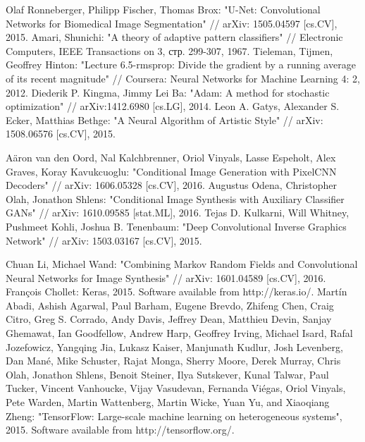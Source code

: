 \documentclass[a4paper]{article}
\begin{document}
\begin{thebibliography}{99}
		 Olaf Ronneberger, Philipp Fischer, Thomas Brox: "U-Net: Convolutional Networks for Biomedical Image Segmentation" // arXiv: 1505.04597 [cs.CV], 2015.
		 Amari, Shunichi: "A theory of adaptive pattern classifiers" // Electronic Computers, IEEE Transactions on 3, стр. 299-307, 1967.
		 Tieleman, Tijmen, Geoffrey Hinton: "Lecture 6.5-rmsprop: Divide the gradient by a running average of its recent magnitude" // Coursera: Neural Networks for Machine Learning 4: 2, 2012.
		 Diederik P. Kingma, Jimmy Lei Ba: "Adam: A method for stochastic optimization" // arXiv:1412.6980 [cs.LG], 2014.
		 Leon A. Gatys, Alexander S. Ecker, Matthias Bethge: "A Neural Algorithm of Artistic Style" // arXiv: 1508.06576 [cs.CV], 2015.
		
		 A\"aron van den Oord, Nal Kalchbrenner, Oriol Vinyals, Lasse Espeholt, Alex Graves, Koray Kavukcuoglu: "Conditional Image Generation with PixelCNN Decoders" // arXiv: 1606.05328 [cs.CV], 2016.
		 Augustus Odena, Christopher Olah, Jonathon Shlens: "Conditional Image Synthesis with Auxiliary Classifier GANs" // arXiv: 1610.09585 [stat.ML], 2016.
		 Tejas D. Kulkarni, Will Whitney, Pushmeet Kohli, Joshua B. Tenenbaum: "Deep Convolutional Inverse Graphics Network" // arXiv: 1503.03167 [cs.CV], 2015.
		
		 Chuan Li, Michael Wand: "Combining Markov Random Fields and Convolutional Neural Networks for Image Synthesis" // arXiv: 1601.04589 [cs.CV], 2016.
		 François Chollet: Keras, 2015. Software available from http://keras.io/.
		 Martín Abadi, Ashish Agarwal, Paul Barham, Eugene Brevdo, Zhifeng Chen, Craig Citro, Greg S. Corrado, Andy Davis, Jeffrey Dean, Matthieu Devin, Sanjay Ghemawat, Ian Goodfellow, Andrew Harp, Geoffrey Irving, Michael Isard, Rafal Jozefowicz, Yangqing Jia, Lukasz Kaiser, Manjunath Kudlur, Josh Levenberg, Dan Mané, Mike Schuster, Rajat Monga, Sherry Moore, Derek Murray, Chris Olah, Jonathon Shlens, Benoit Steiner, Ilya Sutskever, Kunal Talwar, Paul Tucker, Vincent Vanhoucke, Vijay Vasudevan, Fernanda Viégas, Oriol Vinyals, Pete Warden, Martin Wattenberg, Martin Wicke, Yuan Yu, and Xiaoqiang Zheng: "TensorFlow: Large-scale machine learning on heterogeneous systems", 2015. Software available from http://tensorflow.org/.
	\end{thebibliography}
	
\end{document}
